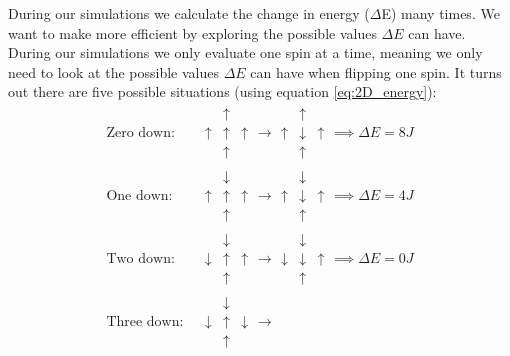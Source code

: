 \documentclass[reprint, english,notitlepage,nofootinbib]{revtex4-1}  %
\begin{document}
During our simulations we calculate the change in energy ($\Delta$E) many times. We want to make more efficient by exploring the possible values $\Delta E$ can have. During our simulations we only evaluate one spin at a time, meaning we only need to look at the possible values $\Delta E$ can have when flipping one spin. It turns out there are five possible situations (using equation \eqref{eq:2D_energy}):
\begin{align*}
	\text{Zero down: } &\begin{matrix}
	& \uparrow  \\
	\uparrow & \uparrow & \uparrow \\
	& \uparrow
	\end{matrix}
	\rightarrow
	\begin{matrix}
	& \uparrow  \\
	\uparrow & \downarrow & \uparrow \\
	& \uparrow
	\end{matrix}
	\implies
	\Delta E = 8J \\
	\text{One down: }
		&\begin{matrix}
	& \downarrow  \\
	\uparrow & \uparrow & \uparrow \\
	& \uparrow
	\end{matrix}
	\rightarrow
	\begin{matrix}
	& \downarrow  \\
	\uparrow & \downarrow & \uparrow \\
	& \uparrow
	\end{matrix}
	\implies
	\Delta E = 4J \\
	\text{Two down: }
		&\begin{matrix}
	& \downarrow  \\
	\downarrow & \uparrow & \uparrow \\
	& \uparrow
	\end{matrix}
	\rightarrow
	\begin{matrix}
	& \downarrow  \\
	\downarrow & \downarrow & \uparrow \\
	& \uparrow
	\end{matrix}
	\implies
	\Delta E = 0J \\
	\text{Three down: }
		&\begin{matrix}
	& \downarrow  \\
	\downarrow & \uparrow & \downarrow \\
	& \uparrow
	\end{matrix}
	\rightarrow

\end{align*}
\end{document}

